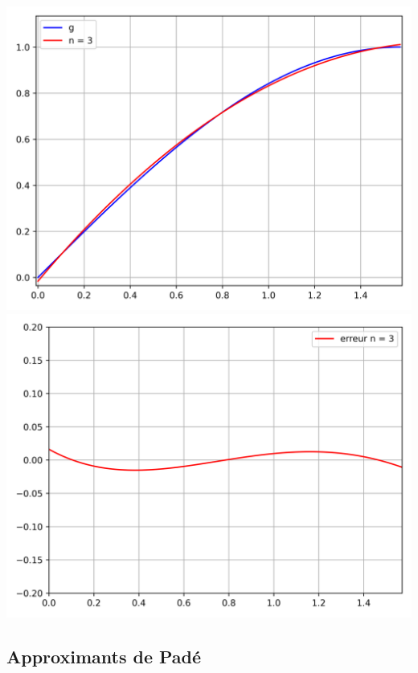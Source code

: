 \documentclass[11pt,class=report,crop=false]{standalone}
\begin{document}
\begin{exemple}
\begin{itemize}
  \begin{center}
    \includegraphics[scale=\myscale,scale=0.45]{figures/approx-tchebychev-04} \qquad
    \includegraphics[scale=\myscale,scale=0.45]{figures/approx-tchebychev-05}
  \end{center}

\end{itemize}
\end{exemple}

\subsection{Approximants de Padé}
\end{document}
